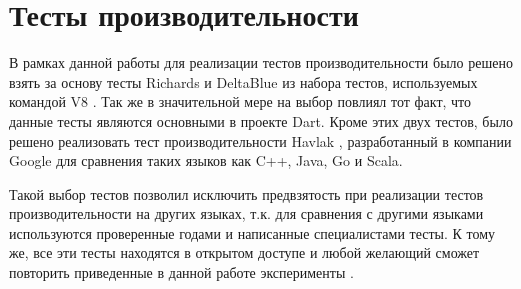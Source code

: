 \section{Тесты производительности}



В рамках данной работы для реализации тестов производительности было решено взять за основу тесты Richards и DeltaBlue из набора тестов, используемых командой V8 \cite{V8:Benchmarks}. Так же в значительной мере на выбор повлиял тот факт, что данные тесты являются основными в проекте Dart.
Кроме этих двух тестов, было решено реализовать тест производительности Havlak \cite{Havlak}, разработанный в компании Google для сравнения таких языков как C++, Java, Go и Scala.

Такой выбор тестов позволил исключить предвзятость при реализации тестов производительности на других языках, т.к. для сравнения с другими языками используются проверенные годами и написанные специалистами тесты. К тому же, все эти тесты находятся в открытом доступе и любой желающий сможет повторить приведенные в данной работе эксперименты \cite{v8:bench:src, dart:bench:src, kotlin:bench:src}.

